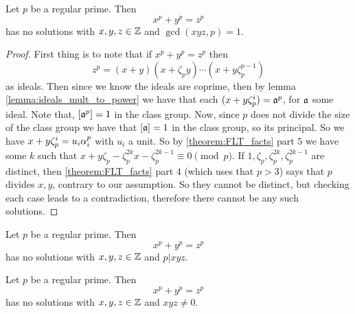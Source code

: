 \begin{theorem}\label{theorem:FLT_case_one}
	Let $p$ be a regular prime. Then \[x^p+y^p=z^p\] has no solutions with $x,y,z \in \mathbb{Z}$ and $\gcd(xyz,p)=1$.
\end{theorem}
\begin{proof}
	First thing is to note that if $x^p+y^p=z^p$ then \[z^p=(x+y)(x+\zeta_py)\cdots(x+y\zeta_p^{p-1})\] as ideals. Then since we know the ideals are coprime, then by lemma \ref{lemma:ideals_mult_to_power} we have that each $(x+y\zeta_p^i)=\mathfrak{a}^p$, for $\mathfrak{a}$ some ideal. Note that, $[\mathfrak{a}^p]=1$ in the class group. Now, since $p$ does not divide the size of the class group we have that $[\mathfrak{a}]=1$ in the class group, so its principal. So we have $x+y\zeta_p^i=u_i\alpha_i^p$ with $u_i$ a unit. So by \ref{theorem:FLT_facts} part $5$ we have some $k$ such that $x+y\zeta_p-\zeta_p^{2k}x-\zeta_p^{2k-1} \equiv 0 \pmod p$. If $1,\zeta_p,\zeta_p^{2k},\zeta_p^{2k-1}$ are distinct, then \ref{theorem:FLT_facts} part $4$ (which uses that $p>3$) says that $p$  divides $x,y$, contrary to our assumption. So they cannot be distinct, but checking each case leads to a contradiction, therefore there cannot be any such solutions.
\end{proof}

\begin{theorem}\label{theorem:FLT_case_two}
	Let $p$ be a regular prime. Then \[x^p+y^p=z^p\] has no solutions with $x,y,z \in \mathbb{Z}$ and $p | xyz$.
\end{theorem}


\begin{theorem}\label{FLT_regular}
	Let $p$ be a regular prime.  Then \[x^p+y^p=z^p\] has no solutions with $x,y,z \in \mathbb{Z}$ and $xyz \ne 0$.
\end{theorem}
